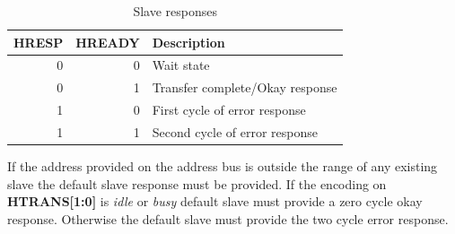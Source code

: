 \begin{table}[hbt]
  \label{tab:hsize}
  \begin{tabular}{|r|r|p{10cm}|} 
  \hline
  \textbf{HRESP} & \textbf{HREADY} & \textbf{Description} \\
    \hline
  0 & 0 & Wait state\\
    \hline
  0 & 1 & Transfer complete/Okay response \\
    \hline
  1 & 0 & First cycle of error response\\
    \hline
  1 & 1 & Second cycle of error response \\
\hline
  \end{tabular}
\caption{Slave responses}
\end{table}

If the address provided on the address bus is outside the range of any existing slave the default slave response must be provided. If the encoding on \textbf{HTRANS[1:0]} is \textit{idle} or \textit{busy} default slave must provide a zero cycle okay response. Otherwise the default slave must provide the two cycle error response. 




